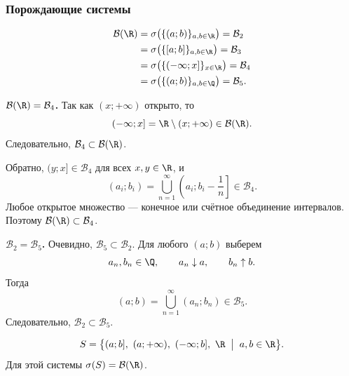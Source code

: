 \subsubsection{Порождающие системы}

\begin{theorem}
    \[
        \begin{aligned}
            \mathcal{B}(\R)
            &=\sigma\bigl(\{(a;b)\}_{a,b\in\R}\bigr)
              =\mathcal{B}_2\\
            &=\sigma\bigl(\{[a;b]\}_{a,b\in\R}\bigr)
              =\mathcal{B}_3\\
            &=\sigma\bigl(\{(-\infty;x]\}_{x\in\R}\bigr)
              =\mathcal{B}_4\\
            &=\sigma\bigl(\{(a;b)\}_{a,b\in\Q}\bigr)
              =\mathcal{B}_5.
        \end{aligned}
    \]
\end{theorem}

\begin{Proof}
    \textbf{$\mathcal{B}(\R)=\mathcal{B}_4$.}
    Так как $(x;+\infty)$ открыто, то
    \[
        (-\infty;x]=\R\setminus(x;+\infty)\in\mathcal{B}(\R).
    \]
    Следовательно, $\mathcal{B}_4\subset\mathcal{B}(\R)$.

    Обратно, $(y;x]\in\mathcal{B}_4$ для всех $x,y\in\R$, и
    \[
        (a_i;b_i)=\bigcup_{n=1}^{\infty}
        \left(a_i;b_i-\frac1n\right]\in\mathcal{B}_4.
    \]
    Любое открытое множество --- конечное или счётное
    объединение интервалов. Поэтому
    $\mathcal{B}(\R)\subset\mathcal{B}_4$.

    \textbf{$\mathcal{B}_2=\mathcal{B}_5$.}
    Очевидно, $\mathcal{B}_5\subset\mathcal{B}_2$.
    Для любого $(a;b)$ выберем
    \[
        a_n,b_n\in\Q,\qquad a_n\downarrow a,
        \qquad b_n\uparrow b.
    \]
    Тогда
    \[
        (a;b)=\bigcup_{n=1}^{\infty}(a_n;b_n)\in\mathcal{B}_5.
    \]
    Следовательно, $\mathcal{B}_2\subset\mathcal{B}_5$.
\end{Proof}

\begingroup
{}
\begin{example}
    \[
        S=\bigl\{(a;b],\ (a;+\infty),\ (-\infty;b],\ \R
        \;\bigm|\; a,b\in\R\bigr\}.
    \]
    Для этой системы $\sigma(S)=\mathcal{B}(\R)$.
\end{example}
\endgroup
